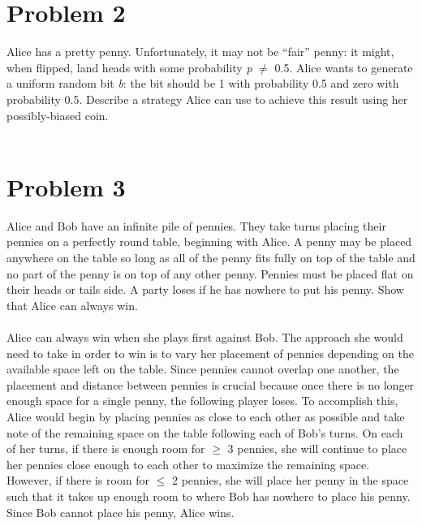 \documentclass[paper=letter, fontsize=12pt]{article}
\begin{document}
\section*{Problem 2}
Alice has a pretty penny. Unfortunately, it may not be ``fair'' penny: it might, when flipped,
land heads with some probability \textit{p} \(\neq\) 0.5. Alice wants to generate a uniform random bit \textit{b}: the bit
should be 1 with probability 0.5 and zero with probability 0.5. Describe a strategy Alice can use
to achieve this result using her possibly-biased coin. \\ \\



\section*{Problem 3}
Alice and Bob have an infinite pile of pennies. They take turns placing their pennies on a
perfectly round table, beginning with Alice. A penny may be placed anywhere on the table so long
as all of the penny fits fully on top of the table and no part of the penny is on top of any other
penny. Pennies must be placed flat on their heads or tails side. A party loses if he has nowhere to
put his penny. Show that Alice can always win. \\ \\
Alice can always win when she plays first against Bob. The approach she would need to take in order to win is to
vary her placement of pennies depending on the available space left on the table. Since pennies cannot overlap one
another, the placement and distance between pennies is crucial because once there is no longer enough space for a single
penny, the following player loses. To accomplish this, Alice would begin by placing pennies as close to each other as
possible and take note of the remaining space on the table following each of Bob's turns. On each of her turns, if there
is enough room for \(\geq\) 3 pennies, she will continue to place her pennies close enough to each other to maximize
the remaining space. However, if there is room for \(\leq\) 2 pennies, she will place her penny in the space such that it takes
up enough room to where Bob has nowhere to place his penny. Since Bob cannot place his penny, Alice wins.
\end{document}
